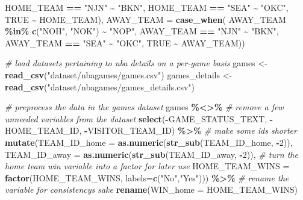 \documentclass[
  12pt,
  a4paper,
]{article}
\newenvironment{Shaded}{\begin{snugshade}}{\end{snugshade}}
\newcommand{\AttributeTok}[1]{\textcolor[rgb]{0.13,0.29,0.53}{#1}}
\newcommand{\CommentTok}[1]{\textcolor[rgb]{0.56,0.35,0.01}{\textit{#1}}}
\newcommand{\ConstantTok}[1]{\textcolor[rgb]{0.56,0.35,0.01}{#1}}
\newcommand{\DecValTok}[1]{\textcolor[rgb]{0.00,0.00,0.81}{#1}}
\newcommand{\FunctionTok}[1]{\textcolor[rgb]{0.13,0.29,0.53}{\textbf{#1}}}
\newcommand{\NormalTok}[1]{#1}
\newcommand{\OtherTok}[1]{\textcolor[rgb]{0.56,0.35,0.01}{#1}}
\newcommand{\SpecialCharTok}[1]{\textcolor[rgb]{0.81,0.36,0.00}{\textbf{#1}}}
\newcommand{\StringTok}[1]{\textcolor[rgb]{0.31,0.60,0.02}{#1}}
\begin{document}
\begin{Shaded}
\begin{Highlighting}[]
\NormalTok{         HOME\_TEAM }\SpecialCharTok{==} \StringTok{"NJN"} \SpecialCharTok{\textasciitilde{}} \StringTok{"BKN"}\NormalTok{,}
\NormalTok{         HOME\_TEAM }\SpecialCharTok{==} \StringTok{"SEA"} \SpecialCharTok{\textasciitilde{}} \StringTok{"OKC"}\NormalTok{,}
         \ConstantTok{TRUE} \SpecialCharTok{\textasciitilde{}}\NormalTok{ HOME\_TEAM),}
         \AttributeTok{AWAY\_TEAM  =} \FunctionTok{case\_when}\NormalTok{(}
\NormalTok{         AWAY\_TEAM }\SpecialCharTok{\%in\%} \FunctionTok{c}\NormalTok{(}\StringTok{"NOH"}\NormalTok{, }\StringTok{"NOK"}\NormalTok{) }\SpecialCharTok{\textasciitilde{}} \StringTok{"NOP"}\NormalTok{,}
\NormalTok{         AWAY\_TEAM }\SpecialCharTok{==} \StringTok{"NJN"} \SpecialCharTok{\textasciitilde{}} \StringTok{"BKN"}\NormalTok{,}
\NormalTok{         AWAY\_TEAM }\SpecialCharTok{==} \StringTok{"SEA"} \SpecialCharTok{\textasciitilde{}} \StringTok{"OKC"}\NormalTok{,}
         \ConstantTok{TRUE} \SpecialCharTok{\textasciitilde{}}\NormalTok{ AWAY\_TEAM))}

\CommentTok{\# load datasets pertaining to nba details on a per{-}game basis}
\NormalTok{games           }\OtherTok{\textless{}{-}} \FunctionTok{read\_csv}\NormalTok{(}\StringTok{"dataset/nbagames/games.csv"}\NormalTok{)}
\NormalTok{games\_details   }\OtherTok{\textless{}{-}} \FunctionTok{read\_csv}\NormalTok{(}\StringTok{"dataset/nbagames/games\_details.csv"}\NormalTok{)}

\CommentTok{\# preprocess the data in the games dataset}
\NormalTok{games }\SpecialCharTok{\%\textless{}\textgreater{}\%}
  \CommentTok{\# remove a few unneeded variables from the dataset}
  \FunctionTok{select}\NormalTok{(}\SpecialCharTok{{-}}\NormalTok{GAME\_STATUS\_TEXT, }\SpecialCharTok{{-}}\NormalTok{HOME\_TEAM\_ID, }\SpecialCharTok{{-}}\NormalTok{VISITOR\_TEAM\_ID) }\SpecialCharTok{\%\textgreater{}\%}
  \CommentTok{\# make some ids shorter}
  \FunctionTok{mutate}\NormalTok{(}\AttributeTok{TEAM\_ID\_home =} \FunctionTok{as.numeric}\NormalTok{(}\FunctionTok{str\_sub}\NormalTok{(TEAM\_ID\_home, }\SpecialCharTok{{-}}\DecValTok{2}\NormalTok{)),}
         \AttributeTok{TEAM\_ID\_away =} \FunctionTok{as.numeric}\NormalTok{(}\FunctionTok{str\_sub}\NormalTok{(TEAM\_ID\_away, }\SpecialCharTok{{-}}\DecValTok{2}\NormalTok{)),}
         \CommentTok{\# turn the home team win variable into a factor for later use}
         \AttributeTok{HOME\_TEAM\_WINS =} \FunctionTok{factor}\NormalTok{(HOME\_TEAM\_WINS,}
                                 \AttributeTok{labels=}\FunctionTok{c}\NormalTok{(}\StringTok{"No"}\NormalTok{,}\StringTok{"Yes"}\NormalTok{))) }\SpecialCharTok{\%\textgreater{}\%}
  \CommentTok{\# rename the variable for consistency\textquotesingle{}s sake}
  \FunctionTok{rename}\NormalTok{(}\AttributeTok{WIN\_home =}\NormalTok{ HOME\_TEAM\_WINS)}


\end{Highlighting}
\end{Shaded}
\end{document}
